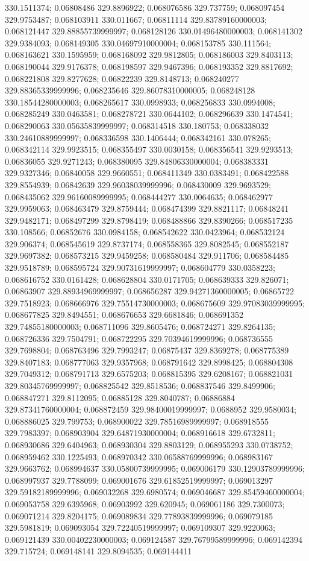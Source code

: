 330.1511374; 0.06808486 329.8896922; 0.068076586 329.737759; 0.068097454 329.9753487; 0.068103911 330.011667; 0.06811114 329.83789160000003; 0.068121447 329.88855739999997; 0.068128126 330.01496480000003; 0.068141302 329.9384093; 0.068149305 330.04697910000004; 0.068153785 330.111564; 0.068163621 330.1595959; 0.068168092 329.9812805; 0.068186003 329.8403113; 0.068190044 329.9176378; 0.068198597 329.9467396; 0.068193352 329.8817692; 0.068221808 329.8277628; 0.06822239 329.8148713; 0.068240277 329.88365339999996; 0.068235646 329.86078310000005; 0.068248128 330.18544280000003; 0.068265617 330.0998933; 0.068256833 330.0994008; 0.068285249 330.0463581; 0.068278721 330.0644102; 0.068296639 330.1474541; 0.068290063 330.05635839999997; 0.068314518 330.180753; 0.068338032 330.24610889999997; 0.068336598 330.1406444; 0.068342161 330.078265; 0.068342114 329.9923515; 0.068355497 330.0030158; 0.068356541 329.9293513; 0.06836055 329.9271243; 0.068380095 329.84806330000004; 0.068383331 329.9327346; 0.06840058 329.9660551; 0.068411349 330.0383491; 0.068422588 329.8554939; 0.06842639 329.96038039999996; 0.068430009 329.9693529; 0.068435062 329.96160089999995; 0.068444277 330.0064635; 0.068462977 329.9959063; 0.068463479 329.8759444; 0.068474399 329.8821117; 0.06848241 329.9482171; 0.068497299 329.8798419; 0.068488866 329.8390266; 0.068517235 330.108566; 0.06852676 330.0984158; 0.068542622 330.0423964; 0.068532124 329.906374; 0.068545619 329.8737174; 0.068558365 329.8082545; 0.068552187 329.9697382; 0.068573215 329.9459258; 0.068580484 329.911706; 0.068584485 329.9518789; 0.068595724 329.90731619999997; 0.068604779 330.0358223; 0.068616752 330.0161428; 0.068628804 330.0171705; 0.068639333 329.826071; 0.06863907 329.88934969999997; 0.068656287 329.94271360000005; 0.06865722 329.7518923; 0.068666976 329.75514730000003; 0.068675609 329.97083039999995; 0.068677825 329.8494551; 0.068676653 329.6681846; 0.068691352 329.74855180000003; 0.068711096 329.8605476; 0.068724271 329.8264135; 0.068726336 329.7504791; 0.068722295 329.70394619999996; 0.068736555 329.7698804; 0.068763496 329.7993247; 0.06875437 329.8369278; 0.068775389 329.8407183; 0.068777063 329.9357968; 0.068791642 329.8998425; 0.068804308 329.7049312; 0.068791713 329.6575203; 0.068815395 329.6208167; 0.068821031 329.80345769999997; 0.068825542 329.8518536; 0.068837546 329.8499906; 0.068847271 329.8112095; 0.06885128 329.8040787; 0.06886884 329.87341760000004; 0.068872459 329.98400019999997; 0.0688952 329.9580034; 0.068886025 329.799753; 0.068900022 329.78516989999997; 0.068918555 329.7983397; 0.068903904 329.64871930000004; 0.068916618 329.6732811; 0.068930686 329.6404963; 0.068930304 329.8803129; 0.068955293 330.0738752; 0.068959462 330.1225493; 0.068970342 330.06588769999996; 0.068983167 329.9663762; 0.068994637 330.05800739999995; 0.069006179 330.12903789999996; 0.068997937 329.7788099; 0.069001676 329.61852519999997; 0.069013297 329.59182189999996; 0.069032268 329.6980574; 0.069046687 329.85459460000004; 0.069053758 329.6395968; 0.06903992 329.620945; 0.069061186 329.7300073; 0.069071214 329.8204175; 0.069089834 329.77893839999996; 0.069079185 329.5981819; 0.069093054 329.72240519999997; 0.069109307 329.9220063; 0.069121439 330.00402230000003; 0.069124587 329.76799589999996; 0.069142394 329.715724; 0.069148141 329.8094535; 0.069144411 